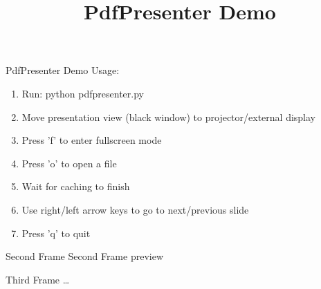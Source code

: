 \documentclass{beamer}
\title{PdfPresenter Demo}
\begin{document}
\begin{frame}{PdfPresenter Demo}
Usage:
\begin{enumerate}
	\item Run: python pdfpresenter.py
	\item Move presentation view (black window) to projector/external display
	\item Press 'f' to enter fullscreen mode
	\item Press 'o' to open a file
	\item Wait for caching to finish
	\item Use right/left arrow keys to go to next/previous slide
	\item Press 'q' to quit
\end{enumerate}
\end{frame}

\begin{frame}{Second Frame}
Second Frame preview
\end{frame}
\begin{frame}{Third Frame}
\dots
\end{frame}
\end{document}
